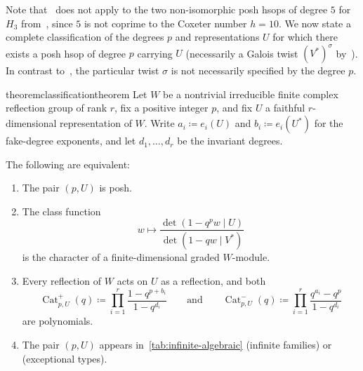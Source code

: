 \documentclass[11pt]{amsart}
\newcommand{\defeq}{\coloneqq}
\newcommand{\operatorstyle}{\textstyle}
\DeclareMathOperator{\Cat}{Cat}
\theoremstyle{definition}
\newcommand{\nathan}[1]{\todo[size=\tiny,color=green!30]{#1 \\ \hfill --- N.}}
\begin{document}
Note that~ does not apply to the two non-isomorphic posh hsops of degree $5$ for $H_3$ from~, since $5$ is not coprime to the Coxeter number $h=10$.  We now state a complete classification of the degrees $p$ and representations $U$ for which there exists a posh hsop of degree $p$ carrying $U$ (necessarily a Galois twist $(V^*)^\sigma$ by~).  In contrast to~, the particular twist $\sigma$ is not necessarily specified by the degree $p$.

\begin{restatable}{theorem}{classificationtheorem}\label{c:thm:main}
Let $W$ be a nontrivial irreducible finite complex reflection group of rank $r$,
fix a positive integer $p$, and fix $U$ a faithful $r$-dimensional
representation of $W$. Write $a_i\defeq e_i(U)$ and
$b_i\defeq e_i(U^*)$ for the fake-degree exponents, and let
$d_1,\ldots,d_r$ be the invariant degrees. 

The following are
equivalent:
\begin{enumerate}
\item The pair $(p,U)$ is posh.
\item The class function
\[
 w\longmapsto\frac{\det(1-q^p w\mid U)}{\det(1-qw\mid V^*)}
\]
is the character of a finite-dimensional graded $W$-module.
\item Every reflection of $W$ acts on $U$ as a reflection, and both
\begin{equation*}
 \operatorstyle
 \Cat^+_{p,U}(q)\defeq\prod\limits_{i=1}^r\frac{1-q^{p+b_i}}{1-q^{d_i}}
 \qquad\text{and}\qquad
 \Cat^-_{p,U}(q)\defeq\prod\limits_{i=1}^r
                              \frac{q^{a_i}-q^p}{1-q^{d_i}}
\end{equation*}
are polynomials.
\item The pair $(p,U)$ appears in~\cref{tab:infinite-algebraic} (infinite families) or~ (exceptional types).%
\end{enumerate}
\end{restatable}

\end{document}
